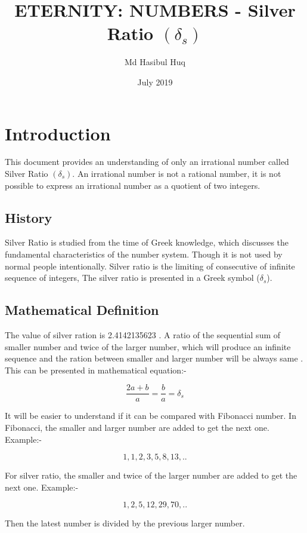 \documentclass{article}
\title{ETERNITY: NUMBERS - Silver Ratio $(\delta_s)$}
\author{Md Hasibul Huq}
\date{July 2019}
\begin{document}
\maketitle

\section{Introduction}          %

This document provides an understanding of only an irrational  number called Silver Ratio $(\delta_s)$. An irrational  number is  not  a rational  number, it is not possible to express an irrational number as a quotient of two integers.
\subsection{History}
Silver Ratio is studied from the time of Greek knowledge, which discusses the fundamental characteristics of the number system. Though it is not used by normal people intentionally. Silver ratio is the limiting of consecutive  of infinite sequence of integers, The silver ratio is presented in a Greek symbol ($\delta_s$).

\subsection{Mathematical Definition}
The value of silver ration is 2.4142135623 \cite{jdc_silver}. A ratio of the sequential sum of smaller number and twice of the larger number, which will produce an infinite sequence and the ration between smaller and larger number will be always same \cite{numberphile_silver}. This can be presented in mathematical equation:- 

\[ \dfrac{2a + b}{a}  = \dfrac{b}{a} = \delta_s \] \newline

It will be easier to understand if it can be compared with Fibonacci number.
In Fibonacci, the smaller and larger number are added to get the next one. 
Example:-

\[1,1,2,3,5,8,13,..\] \newline

For silver ratio, the smaller and twice of the larger number are added to get the next one. Example:-

\[1,2,5,12,29,70,..\] 

Then the latest number is divided  by the previous larger number. 
\end{document}
